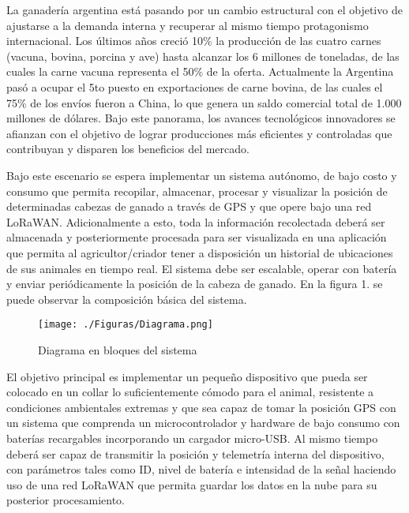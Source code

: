 \documentclass[11pt]{charter}
\begin{document}
La ganadería argentina está pasando por un cambio estructural con el objetivo de ajustarse a la demanda interna y recuperar al mismo tiempo protagonismo internacional. Los últimos años creció 10\% la producción de las cuatro carnes (vacuna, bovina, porcina y ave) hasta alcanzar los 6 millones de toneladas, de las cuales la carne vacuna representa el 50\% de la oferta. Actualmente la Argentina pasó a ocupar el 5to puesto en exportaciones de carne bovina, de las cuales el 75\% de los envíos fueron a China, lo que genera un saldo comercial total de 1.000 millones de dólares. Bajo este panorama, los avances tecnológicos innovadores se afianzan con el objetivo de lograr producciones más eficientes y controladas que contribuyan y disparen los beneficios del mercado. 

Bajo este escenario se espera implementar un sistema autónomo, de bajo costo y consumo que permita recopilar, almacenar, procesar y visualizar la posición de determinadas cabezas de ganado a través de GPS y que opere bajo una red LoRaWAN. Adicionalmente a esto, toda la información recolectada deberá ser almacenada y posteriormente procesada para ser visualizada en una aplicación que permita al agricultor/criador tener a disposición un historial de ubicaciones de sus animales en tiempo real. El sistema debe ser escalable, operar con batería y enviar periódicamente la posición de la cabeza de ganado.  En la figura 1. se puede observar la composición básica del sistema. 



\vspace{25px}

\begin{figure}[htpb]
\centering 
\texttt{[image: ./Figuras/Diagrama.png]}
\caption{Diagrama en bloques del sistema}
\label{fig:diagBloques}
\end{figure}

\vspace{25px}

El objetivo principal es implementar un pequeño dispositivo que pueda ser colocado en un collar lo suficientemente cómodo para el animal, resistente a condiciones ambientales extremas y que sea capaz de tomar la posición GPS con un sistema que comprenda un microcontrolador y hardware de bajo consumo con baterías recargables incorporando un cargador micro-USB. Al mismo tiempo deberá ser capaz de transmitir la posición y telemetría interna del dispositivo, con parámetros tales como ID, nivel de batería e intensidad de la señal haciendo uso de una red LoRaWAN que permita guardar los datos en la nube para su posterior procesamiento. 
\end{document}
